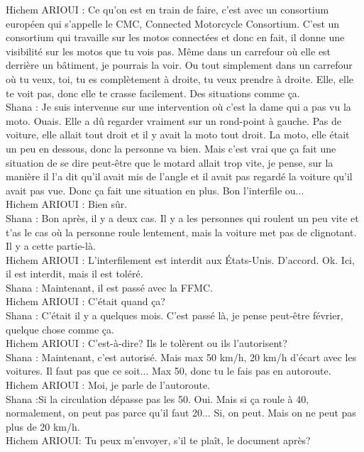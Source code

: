 Hichem ARIOUI : Ce qu'on est en train de faire, c'est avec un consortium européen qui s'appelle le CMC, Connected Motorcycle Consortium. C'est un consortium qui travaille sur les motos connectées et donc en fait, il donne une visibilité sur les motos que tu vois pas. Même dans un carrefour où elle est derrière un bâtiment, je pourrais la voir. Ou tout simplement dans un carrefour où tu veux, toi, tu es complètement à droite, tu veux prendre à droite. Elle, elle te voit pas, donc elle te crasse facilement. Des situations comme ça. \\
Shana : Je suis intervenue sur une intervention où c'est la dame qui a pas vu la moto. Ouais. Elle a dû regarder vraiment sur un rond-point à gauche. Pas de voiture, elle allait tout droit et il y avait la moto tout droit. La moto, elle était un peu en dessous, donc la personne va bien. Mais c'est vrai que ça fait une situation de se dire peut-être que le motard allait trop vite, je pense, sur la manière il l'a dit qu'il avait mis de l'angle et il avait pas regardé la voiture qu'il avait pas vue. Donc ça fait une situation en plus. Bon l'interfile ou... \\
Hichem ARIOUI : Bien sûr. \\
Shana : Bon après, il y a deux cas. Il y a les personnes qui roulent un peu vite et t'as le cas où la personne roule lentement, mais la voiture met pas de clignotant. Il y a cette partie-là. \\
Hichem ARIOUI : L'interfilement est interdit aux États-Unis. D'accord. Ok. Ici, il est interdit, mais il est toléré.\\
Shana : Maintenant, il est passé avec la FFMC. \\
Hichem ARIOUI : C'était quand ça? \\
Shana : C'était il y a quelques mois. C'est passé là, je pense peut-être février, quelque chose comme ça. \\
Hichem ARIOUI : C'est-à-dire? Ils le tolèrent ou ils l'autorisent? \\
Shana : Maintenant, c'est autorisé. Mais max 50 km/h, 20 km/h d'écart avec les voitures. Il faut pas que ce soit... Max 50, donc tu le fais pas en autoroute. \\
Hichem ARIOUI : Moi, je parle de l'autoroute. \\
Shana :Si la circulation dépasse pas les 50. Oui. Mais si ça roule à 40, normalement, on peut pas parce qu'il faut 20... Si, on peut. Mais on ne peut pas plus de 20 km/h. \\
Hichem ARIOUI: Tu peux m'envoyer, s'il te plaît, le document après?\\
